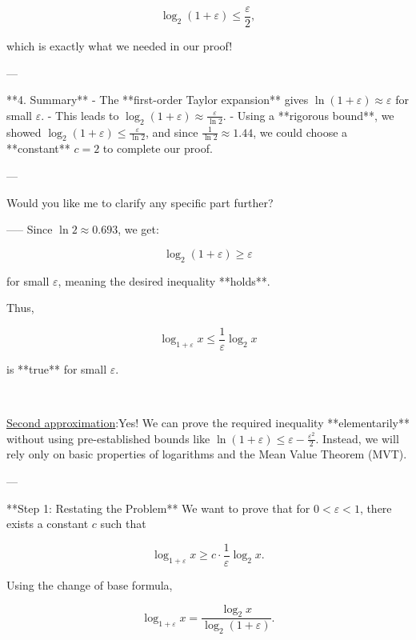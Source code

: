 {       \[
       \log_2(1+\varepsilon) \leq \frac{\varepsilon}{2},
       \]
       
       which is exactly what we needed in our proof!
       
       ---
       
         **4. Summary**
       - The **first-order Taylor expansion** gives \( \ln(1+\varepsilon) \approx \varepsilon \) for small \( \varepsilon \).
       - This leads to \( \log_2(1+\varepsilon) \approx \frac{\varepsilon}{\ln 2} \).
       - Using a **rigorous bound**, we showed \( \log_2(1+\varepsilon) \leq \frac{\varepsilon}{\ln 2} \), and since \( \frac{1}{\ln 2} \approx 1.44 \), we could choose a **constant** \( c = 2 \) to complete our proof.
       
       ---
       
       Would you like me to clarify any specific part further?
       
       
       -----
       Since \( \ln 2 \approx 0.693 \), we get:
       
       \[
       \log_2(1+\varepsilon) \geq \varepsilon
       \]
       
       for small \( \varepsilon \), meaning the desired inequality **holds**.
       
       Thus,
       
       \[
       \log_{1+\varepsilon} x \leq \frac{1}{\varepsilon} \log_2 x
       \]
       
       is **true** for small \( \varepsilon \).
       
       \
       
       \uline{Second approximation}:Yes! We can prove the required inequality **elementarily** without using pre-established bounds like \( \ln(1+\varepsilon) \leq \varepsilon - \frac{\varepsilon^2}{2} \). Instead, we will rely only on basic properties of logarithms and the Mean Value Theorem (MVT).  
       
       ---
       
         **Step 1: Restating the Problem**
       We want to prove that for \( 0 < \varepsilon < 1 \), there exists a constant \( c \) such that
       
       \[
       \log_{1+\varepsilon} x \geq c \cdot \frac{1}{\varepsilon} \log_2 x.
       \]
       
       Using the change of base formula,
       
       \[
       \log_{1+\varepsilon} x = \frac{\log_2 x}{\log_2 (1+\varepsilon)}.
       \]
       
}

